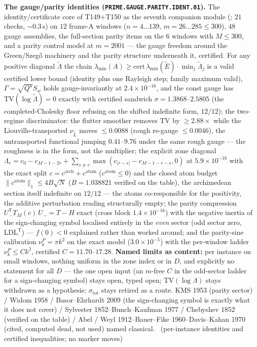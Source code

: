 \par\smallskip\noindent\textbf{The gauge/parity identities
(\texttt{PRIME.GAUGE.PARITY.IDENT.01}).}
The identity/certificate core of T149+T150 as the seventh companion module
(; $21$ checks, ${\sim}0.3$\,s) on
$12$ frame-A windows ($n=4\ldots139$, $m=26\ldots285\le300$), $48$ gauge
assemblies, the full-section parity items on the $6$ windows with $M\le300$,
and a parity control model at $m=2001$ --- the gauge freedom around the
Green/Szeg\H{o} machinery and the parity structure underneath it, certified.
For any positive diagonal $\tilde\Lambda$ the chain
$\lambda_{\min}(A)\ge\mathrm{cert}\,\lambda_{\min}(\tilde E)\cdot
\min_j\tilde\Lambda_j$ is a valid certified lower bound (identity plus one
Rayleigh step; family maximum valid), $\Gamma=\sqrt{Q^\star}S_w$ holds
gauge-invariantly at $2.4\times10^{-16}$, and the const gauge has
$\mathrm{TV}(\log\tilde\Lambda)=0$ exactly with certified sandwich
$\sigma=1.3868$--$2.5805$ (the completed-Cholesky floor refusing on the
shifted indefinite form, $12/12$); the two-regime discriminator: the flutter
smoother removes $\mathrm{TV}$ by $\ge2.88\times$ while the
Liouville-transported $\nu_{\tilde L}$ moves $\le0.0088$ (rough re-gauge
$\le0.0046$), the untransported functional jumping $0.41$--$9.76$ under the
same rough gauge --- the roughness is in the form, not the multiplier; the
explicit zone diagonal
$\Lambda_r=c_0-c_{M-1-2r}+\sum_{s\ne r}\max(c_{|r-s|}-c_{M-1-r-s},0)$ at
$5.9\times10^{-16}$ with the exact split
$c=c^{\mathrm{arch}}+c^{\mathrm{atom}}$ ($c^{\mathrm{atom}}\le0$) and the
closed atom budget $\|c^{\mathrm{atom}}\|_1\le4B\sqrt N$ ($B=1.038821$
verified on the table), the archimedean section itself indefinite on
$12/12$ --- the atoms co-responsible for the positivity, the additive
perturbation reading structurally empty; the parity compression
$U_-^{\mathsf T}T_M(c)\,U_-=T-H$ exact (cross block $1.4\times10^{-16}$)
with the negative inertia of the sign-changing symbol localised entirely in
the \emph{even} sector (odd sector zero, LDL$^{\mathsf T}$) --- $f(0)<0$
explained rather than worked around; and the parity-sine calibration
$\nu^P_k=\pi k^2$ on the exact model ($3.0\times10^{-5}$) with the
per-window ladder $\nu^P_k\le Ck^2$, certified $C=11.70$--$17.28$.
\textbf{Named limits as content:} per instance on small windows, nothing
uniform in the zone index or in $D$, and explicitly no statement for all $D$
--- the one open input (an $m$-free $C$ in the odd-sector ladder for a
sign-changing symbol) stays open, typed open; $\mathrm{TV}(\log\Lambda)$
stays withdrawn as a hypothesis; $\sigma_{\mathrm{tot}}$ stays retired as a
route. KMS 1953 (parity sector) / Widom 1958 / Basor--Ehrhardt 2009 (the
sign-changing symbol is exactly what it does not cover) / Sylvester
1852--Bunch--Kaufman 1977 / Chebyshev 1852 (verified on the table) / Abel /
Weyl 1912--Bauer--Fike 1960--Davis--Kahan 1970 (cited, computed dead, not
used) named classical.
\mE\ (per-instance identities and certified inequalities; no marker moves)
\par\smallskip


